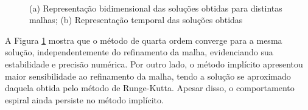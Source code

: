 \begin{figure}[H]
	\centering
	\mbox{
	}
   \mbox{
   }
	\caption{(a) Representação bidimensional das soluções obtidas para distintas malhas; (b) Representação temporal das soluções obtidas}
    \label{img:comparison_plots}
\end{figure}

A Figura \ref{img:comparison_plots} mostra que o método de quarta ordem converge para a mesma solução, independentemente do refinamento da malha, evidenciando sua estabilidade e precisão numérica. Por outro lado, o método implícito apresentou maior sensibilidade ao refinamento da malha, tendo a solução se aproximado daquela obtida pelo método de Runge-Kutta. Apesar disso, o comportamento espiral ainda persiste no método implícito.


